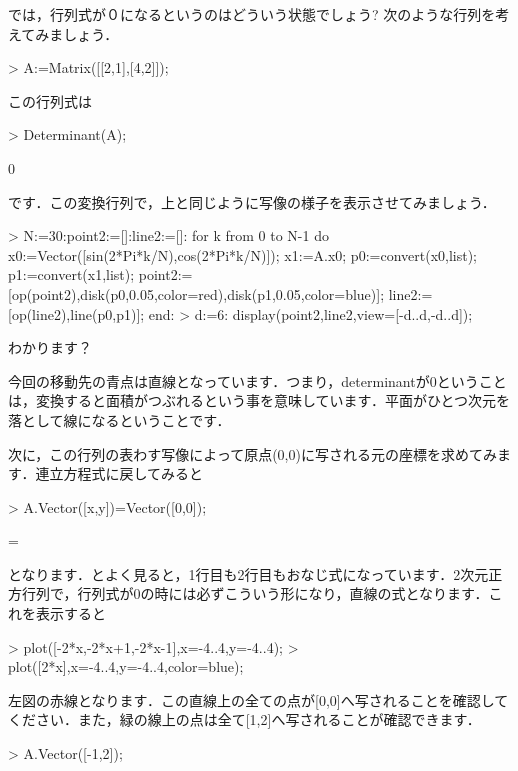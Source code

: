 では，行列式が０になるというのはどういう状態でしょう? 次のような行列を考えてみましょう．
\begin{MapleInput}
> A:=Matrix([[2,1],[4,2]]);
\end{MapleInput}
\begin{MapleOutput}
\end{MapleOutput}
この行列式は
\begin{MapleInput}
> Determinant(A);
\end{MapleInput}
\begin{MapleOutput}
0
\end{MapleOutput}
です．この変換行列で，上と同じように写像の様子を表示させてみましょう．
\begin{MapleInput}
> N:=30:point2:=[]:line2:=[]: 
  for k from 0 to N-1 do
    x0:=Vector([sin(2*Pi*k/N),cos(2*Pi*k/N)]); x1:=A.x0; p0:=convert(x0,list);
    p1:=convert(x1,list);
    point2:=[op(point2),disk(p0,0.05,color=red),disk(p1,0.05,color=blue)];
    line2:=[op(line2),line(p0,p1)]; 
  end:
> d:=6: display(point2,line2,view=[-d..d,-d..d]);
\end{MapleInput}

わかります？

今回の移動先の青点は直線となっています．つまり，determinantが0ということは，変換すると面積がつぶれるという事を意味しています．平面がひとつ次元を落として線になるということです．

次に，この行列の表わす写像によって原点(0,0)に写される元の座標を求めてみます．連立方程式に戻してみると
\begin{MapleInput}
> A.Vector([x,y])=Vector([0,0]);
\end{MapleInput}
\begin{MapleOutput}
\left[ \begin {array}{c} 2\,x+y\\ 4\,x+2\,y\end {array} \right] = \left[ \begin {array}{c} 0\\ 0\end {array} \right]
\end{MapleOutput}
となります．とよく見ると，1行目も2行目もおなじ式になっています．2次元正方行列で，行列式が0の時には必ずこういう形になり，直線の式となります．これを表示すると
\begin{MapleInput}
> plot([-2*x,-2*x+1,-2*x-1],x=-4..4,y=-4..4);
> plot([2*x],x=-4..4,y=-4..4,color=blue);
\end{MapleInput}
左図の赤線となります．この直線上の全ての点が[0,0]へ写されることを確認してください．また，緑の線上の点は全て[1,2]へ写されることが確認できます．
\begin{MapleInput}
> A.Vector([-1,2]);
\end{MapleInput}
\begin{MapleOutput}
\left[ \begin {array}{c} 0\\ 0\end {array} \right]
\end{MapleOutput}

